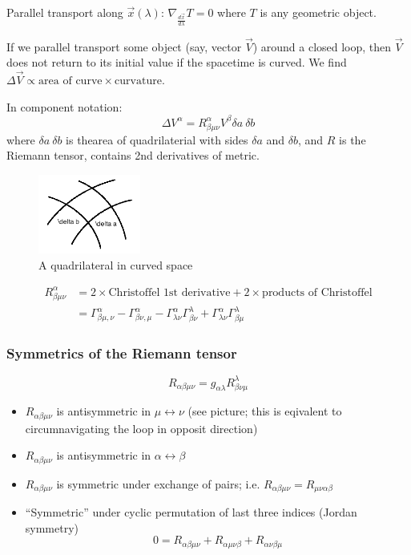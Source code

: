 \documentclass[a4paper]{article} %
\begin{document}
Parallel transport along $\vec{x}(\lambda)$: $\nabla_{\frac{d\vec{x}}{d\lambda}}T=0$ where $T$ is any geometric object.

If we parallel transport some object (say, vector $\vec{V}$) around a closed loop, then $\vec{V}$ does not return to its initial value if the spacetime is curved. We find $\Delta\vec{V}\propto \text{area of curve}\times\text{curvature}$.

In component notation:
\begin{equation}
\Delta V^{\alpha}=R^{\alpha}_{\beta\mu\nu} V^{\beta} \delta a~\delta b
\end{equation}
where $\delta a ~ \delta b$ is thearea of quadrilaterial with sides $\delta a$ and $\delta b$, and $R$ is the Riemann tensor, contains 2nd derivatives of metric.
\begin{figure}[h]
\centering
\includegraphics[width=0.3\textwidth]{images/quadrilateral.png}
\caption{A quadrilateral in curved space}
\end{figure}

\begin{align}
R^{\alpha}_{\beta\mu\nu}&=2\times\text{Christoffel 1st derivative}+ 2\times \text{products of Christoffel}\\
&=\Gamma^{\alpha}_{\beta\mu,\nu}-\Gamma^{\alpha}_{\beta\nu,\mu}
-\Gamma^{\alpha}_{\lambda\nu}\Gamma^{\lambda}_{\beta\nu}
+\Gamma^{\alpha}_{\lambda\nu}\Gamma^{\lambda}_{\beta\mu}
\end{align}


\subsubsection{Symmetrics of the Riemann tensor}
\begin{equation}
R_{\alpha\beta\mu\nu}=g_{\alpha\lambda} R^{\lambda}_{\beta\nu\mu}
\end{equation}
\begin{itemize}
\item $R_{\alpha\beta\mu\nu}$ is antisymmetric in $\mu\leftrightarrow\nu$ (see picture; this is eqivalent to circumnavigating the loop in opposit direction)
\item $R_{\alpha\beta\mu\nu}$ is antisymmetric in $\alpha\leftrightarrow \beta$
\item $R_{\alpha\beta\mu\nu}$ is symmetric under exchange of pairs; i.e. $R_{\alpha\beta\mu\nu}=R_{\mu\nu\alpha\beta}$
\item ``Symmetric'' under cyclic permutation of last three indices (Jordan symmetry)
\begin{equation}
0=R_{\alpha\beta\mu\nu}+R_{\alpha \mu \nu \beta} + R_{\alpha \nu \beta \mu}
\end{equation}
\end{itemize}
\end{document}
